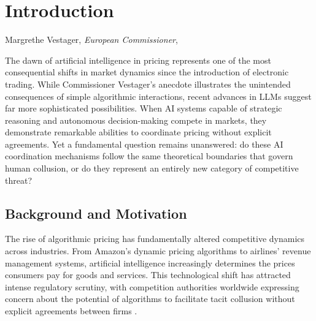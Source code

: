 \section{Introduction}\label{sec:intro}

\epigraph{}{Margrethe Vestager, \emph{European Commissioner}, ~\cite*{vestager_algorithms_2017}}


The dawn of artificial intelligence in pricing represents one of the most consequential shifts in market dynamics since the introduction of electronic trading. While Commissioner Vestager's anecdote illustrates the unintended consequences of simple algorithmic interactions, recent advances in LLMs suggest far more sophisticated possibilities. When AI systems capable of strategic reasoning and autonomous decision-making compete in markets, they demonstrate remarkable abilities to coordinate pricing without explicit agreements. Yet a fundamental question remains unanswered: do these AI coordination mechanisms follow the same theoretical boundaries that govern human collusion, or do they represent an entirely new category of competitive threat?

\subsection{Background and Motivation}
The rise of algorithmic pricing has fundamentally altered competitive dynamics across industries. From Amazon's dynamic pricing algorithms to airlines' revenue management systems, artificial intelligence increasingly determines the prices consumers pay for goods and services. This technological shift has attracted intense regulatory scrutiny, with competition authorities worldwide expressing concern about the potential of algorithms to facilitate tacit collusion without explicit agreements between firms \parencite{oecd_algorithmic_2023, harrington_developing_2018}. 

